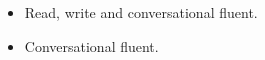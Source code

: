 
\begin{itemize}
\item Read, write and conversational fluent.
\smallskip
\smallskip
\end{itemize}

\begin{itemize}
\item Conversational fluent.
\end{itemize}


\smallskip
\smallskip
\smallskip

\smallskip
\smallskip
\smallskip
\smallskip
\smallskip
\smallskip
\smallskip
\smallskip
\smallskip
\smallskip
\smallskip
\smallskip
\smallskip
\smallskip
\smallskip
\smallskip
\smallskip
\smallskip
\smallskip
\smallskip
\smallskip
\smallskip
\smallskip
\smallskip
\smallskip
\smallskip
\smallskip
\smallskip
\smallskip
\smallskip
\smallskip
\smallskip
\smallskip
\smallskip
\smallskip
\smallskip
\smallskip
\smallskip
\smallskip
\smallskip
\smallskip
\smallskip
\smallskip
\smallskip
\smallskip
\smallskip
\smallskip
\smallskip
\smallskip
